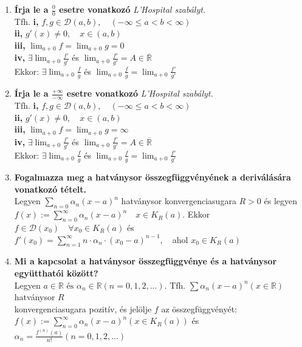 \documentclass[a4paper,11pt]{article}
\begin{document}
\def\dab{\in\D(a,b)}
\def\D{\mathcal{D}}
\def\R{\mathbb{R}}
\def\sumun{\displaystyle\sum_{n=0}}
\def\sumn{\displaystyle\sum_{n=0}^{\infty}}
\def\sume{\displaystyle\sum_{n=1}^{\infty}}
\def\limaj{\displaystyle\lim_{a+0}}
\def\Rv{\overline{\mathbb{R}}}
	\begin{enumerate}
		\item \textbf{Írja le a $\frac{0}{0}$ esetre vonatkozó}
		\textit{L'Hospital szabályt.}\\[0.1cm]
		Tfh. \textbf{i,} $f,g\dab,\quad(-\infty\leq a<b<\infty)$
		\\[0.2cm]\hspace*{0.7cm} \textbf{ii,} $g'(x)\neq0,\quad x\in(a,b)$
		\\[0.2cm]\hspace*{0.8cm}\textbf{iii,} $\limaj f=\limaj g=0$
		\\[0.2cm]\hspace*{0.8cm}\textbf{iv,} $\exists\limaj \frac{f'}{g'}$ és $\limaj\frac{f'}{g'}=A\in\Rv$\\[0.2cm] Ekkor: $\exists\limaj
		\frac{f}{g}$ és $\limaj\frac{f}{g}=\limaj\frac{f'}{g'}$
		\item \textbf{Írja le a $\frac{+\infty}{-\infty}$ esetre vonatkozó}
		\textit{L'Hospital szabályt.}\\[0.1cm]
		Tfh. \textbf{i,} $f,g\dab,\quad(-\infty\leq a<b<\infty)$\\[0.2cm] 
		\hspace*{0.8cm}\textbf{ii,} $g'(x)\neq0,\quad x\in(a,b)$\\[0.2cm] 
		\hspace*{0.8cm}\textbf{iii,} $\limaj f=\limaj g=\infty$\\[0.2cm]
		\hspace*{0.8cm}\textbf{iv,} $\exists\limaj\frac{f'}{g'}$ és $\limaj
		\frac{f'}{g'}=A\in\Rv$\\[0.2cm] Ekkor: $\exists\limaj\frac{f}{g}$ és $\limaj\frac{f}{g}=\limaj\frac{f'}{g'}$
		\item \textbf{Fogalmazza meg a hatványsor összegfüggvényének a deriválására vonatkozó tételt.}\\[0.1cm]
		Legyen $\sumun\alpha_n(x-a)^n$ hatványsor konvergenciasugara $R>0$ és 
		legyen \\$f(x):=\sumn\alpha_n(x-a)^n\quad x\in K_R(a)$. Ekkor $f\in\D(x_0)\quad\forall x_0\in K_R(a)$ és\\$f'(x_0)=\sume n\cdot
		\alpha_n\cdot(x_0-a)^{n-1},\quad$ahol $x_0\in K_R(a)$
		\item \textbf{Mi a kapcsolat a hatványsor összegfüggvénye és a hatványsor együtthatói között?}\\[0.1cm]
		Legyen $a\in\R\text{ és }\alpha_n\in\R(n=0,1,2,...).$ Tfh. $\sum\alpha_n
		(x-a)^n(x\in\R)$ hatványsor $R$\\konvergenciasugara pozitív, és jelölje
		$f$ az összegfüggvényét:\\$f(x):=\sumn\alpha_n(x-a)^n(x\in K_R(a))$ és
		$\alpha_n=\frac{f^{(n)}(a)}{n!}(n=0,1,2,...)$
	\end{enumerate}
\end{document}
